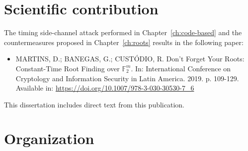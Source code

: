 \section{Scientific contribution}
The timing side-channel attack performed in Chapter~\ref{ch:code-based} and the countermeasures proposed in Chapter~\ref{ch:roots} results in the following paper:

\begin{itemize}
    \item  MARTINS, D.; BANEGAS, G.; CUSTÓDIO, R. Don’t Forget Your Roots: Constant-Time Root Finding over $\mathbb{F}_2^m$. In: International Conference on Cryptology and Information Security in Latin America.  2019. p. 109-129. Available in: \url{https://doi.org/10.1007/978-3-030-30530-7_6}
\end{itemize}

This dissertation includes direct text from this publication.
\section{Organization}


















